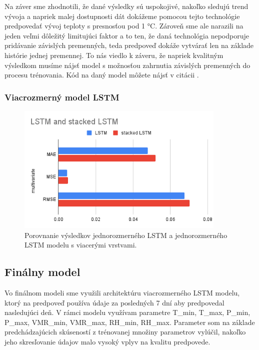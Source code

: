 \newpage
Na záver sme zhodnotili, že dané výsledky sú uspokojivé, nakoľko sledujú trend vývoja a napriek malej dostupnosti dát dokážeme pomocou tejto technológie predpovedať vývoj teploty s presnosťou pod 1 °C. Zároveň sme ale narazili na jeden veľmi dôležitý limitujúci faktor a to ten, že daná technológia nepodporuje pridávanie závislých premenných, teda predpoveď dokáže vytvárať len na základe histórie jednej premennej. To nás viedlo k záveru, že napriek kvalitným výsledkom musíme nájsť model s možnosťou zahrnutia závislých premenných do procesu trénovania. Kód na daný model môžete nájsť v citácii \cite{beats_code}.


\subsubsection{Viacrozmerný model LSTM}
\begin{figure}[!htbp]
  \centering
  \includegraphics[width=10cm]{img/LSTM and stacked LSTM.png}
  \caption{Porovnanie výsledkov jednorozmerného LSTM a jednorozmerného LSTM modelu s viacerými vrstvami.}
  \label{stackedlstm}
\end{figure}


\newpage
\subsection{Finálny model}
Vo finálnom modeli sme využili architektúru viacrozmerného LSTM modelu, ktorý na predpoveď používa údaje za posledných 7 dní aby predpovedal nasledujúci deň. V rámci modelu využívam parametre T\_min, T\_max, P\_min, P\_max, VMR\_min, VMR\_max, RH\_min, RH\_max. Parameter som na základe predchádzajúcich skúseností z trénovanej množiny parametrov vylúčil, nakoľko jeho skresľovanie údajov malo vysoký vplyv na kvalitu predpovede.

